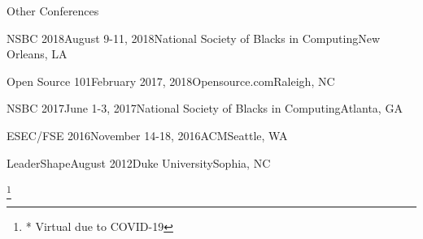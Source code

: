 \documentclass{resume} %
\newcommand\blfootnote[1]{%
  \begingroup
  \renewcommand\thefootnote{}\footnote{#1}%
  \addtocounter{footnote}{-1}%
  \endgroup
}
\begin{document}
\begin{rSection}{Other Conferences}
\begin{sSubsection}{NSBC 2018}{August 9-11, 2018}{National Society of Blacks in Computing}{New Orleans, LA}
\end{sSubsection}
\vspace{-5pt}
\begin{sSubsection}{Open Source 101}{February 2017, 2018}{Opensource.com}{Raleigh, NC}
\end{sSubsection}
\vspace{-5pt}
\begin{sSubsection}{NSBC 2017}{June 1-3, 2017}{National Society of Blacks in Computing}{Atlanta, GA}
\end{sSubsection}
\vspace{-5pt}
\begin{sSubsection}{ESEC/FSE 2016}{November 14-18, 2016}{ACM}{Seattle, WA}
\end{sSubsection}
\vspace{-5pt}
\begin{sSubsection}
{LeaderShape}{August 2012}{Duke University}{Sophia, NC}
\end{sSubsection}
\vspace{-5pt}
\end{rSection}
\blfootnote{* Virtual due to COVID-19}
\end{document}
